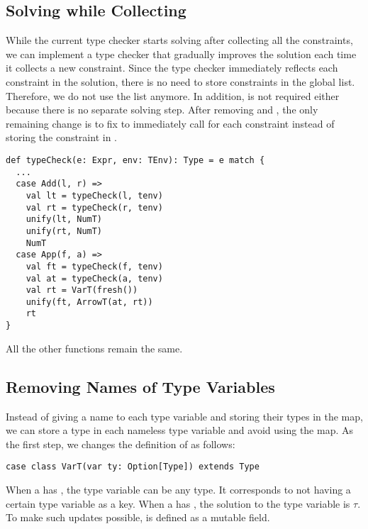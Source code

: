 \subsection{Solving while Collecting}

While the current type checker starts solving after collecting all the
constraints, we can implement a type checker that gradually improves the
solution each time it collects a new constraint. Since the type checker
immediately reflects each constraint in the solution, there is no need to store
constraints in the global list. Therefore, we do not use the 
list anymore. In addition,  is not required either because there is
no separate solving step. After removing  and ,
the only remaining change is to fix  to immediately call
 for each constraint instead of storing the constraint in
.

\begin{verbatim}
def typeCheck(e: Expr, env: TEnv): Type = e match {
  ...
  case Add(l, r) =>
    val lt = typeCheck(l, tenv)
    val rt = typeCheck(r, tenv)
    unify(lt, NumT)
    unify(rt, NumT)
    NumT
  case App(f, a) =>
    val ft = typeCheck(f, tenv)
    val at = typeCheck(a, tenv)
    val rt = VarT(fresh())
    unify(ft, ArrowT(at, rt))
    rt
}
\end{verbatim}

All the other functions remain the same.

\subsection{Removing Names of Type Variables}

Instead of giving a name to each type variable and storing their types in the
 map, we can store a type in each nameless type variable and
avoid using the map. As the first step, we changes the definition of 
as follows:

\begin{verbatim}
case class VarT(var ty: Option[Type]) extends Type
\end{verbatim}

When a  has , the type variable can be any type. It
corresponds to  not having a certain type variable as a key.
When a  has , the solution to the type variable is
$\tau$. To make such updates possible,  is defined as a mutable field.

